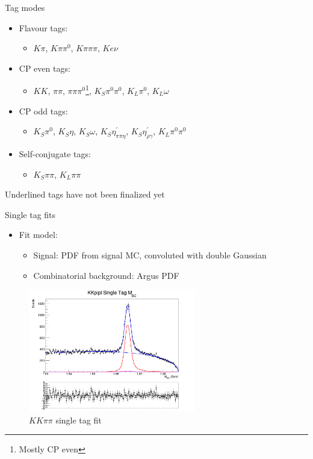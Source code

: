 \documentclass{beamer}
\begin{document}
\renewcommand*{\thefootnote}{\fnsymbol{footnote}}
\begin{frame}{Tag modes}
  \begin{itemize}
    \setlength\itemsep{1.0em}
    \item{Flavour tags:}
    \begin{itemize}
      \item{$K\pi$, $K\pi\pi^0$, $K\pi\pi\pi$, \underline{$Ke\nu$}}
    \end{itemize}
    \item{CP even tags:}
    \begin{itemize}
      \item{$KK$, $\pi\pi$, $\pi\pi\pi^0$\footnote{Mostly CP even}, $K_S\pi^0\pi^0$, $K_L\pi^0$, \underline{$K_L\omega$}}
    \end{itemize}
    \item{CP odd tags:}
    \begin{itemize}
      \item{$K_S\pi^0$, $K_S\eta$, $K_S\omega$, $K_S\eta^\prime_{\pi\pi\eta}$, $K_S\eta^\prime_{\rho\gamma}$, \underline{$K_L\pi^0\pi^0$}}
    \end{itemize}
    \item{Self-conjugate tags:}
    \begin{itemize}
      \item{$K_S\pi\pi$, $K_L\pi\pi$}
    \end{itemize}
  \end{itemize}
  Underlined tags have not been finalized yet
\end{frame}

\begin{frame}{Single tag fits}
  \begin{itemize}
    \item{Fit model:}
    \begin{itemize}
      \item{Signal: PDF from signal MC, convoluted with double Gaussian}
      \item{Combinatorial background: Argus PDF}
    \end{itemize}
  \end{itemize}
  \begin{figure}
    \centering
    \includegraphics[width=0.65\textwidth]{Plots/KKpipi_SingleTag_MBC_Plot.png}
    \caption{$KK\pi\pi$ single tag fit}
  \end{figure}
\end{frame}
\end{document}

